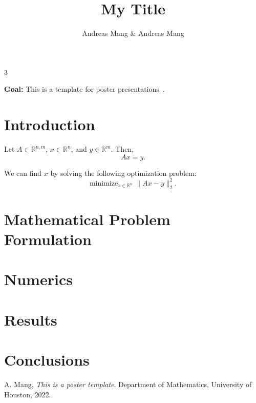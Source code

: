 \documentclass[plainsections,30pt]{sciposter}
\author{Andreas Mang \& Andreas Mang}
\institute{Department of Mathematics}
\title{My Title}
\def\numcols{3}
\begin{document}


\begin{multicols}{\numcols}

\begin{sectionbox}{}
\textbf{Goal:} This is a template for poster presentations~\cite{Mang:2022a}.
\end{sectionbox}


\section*{Introduction}

Let $A \in \mathbb{R}^{n,m}$, $x \in \mathbb{R}^n$, and $y \in \mathbb{R}^m$. Then,
\[
A x = y.
\]

We can find $x$ by solving the following optimization problem:
\[
\text{minimize}_{x\in\mathbb{R}^n} \; \|Ax-y\|_2^2.
\]

\section*{Mathematical Problem Formulation}


\section*{Numerics}


\section*{Results}


\section*{Conclusions}


\begin{footnotesize}
\begin{thebibliography}{9}
 A. Mang, {\em This is a poster template}. Department of Mathematics, University of Houston, 2022.
\end{thebibliography}
\end{footnotesize}

\end{multicols}
\end{document}
